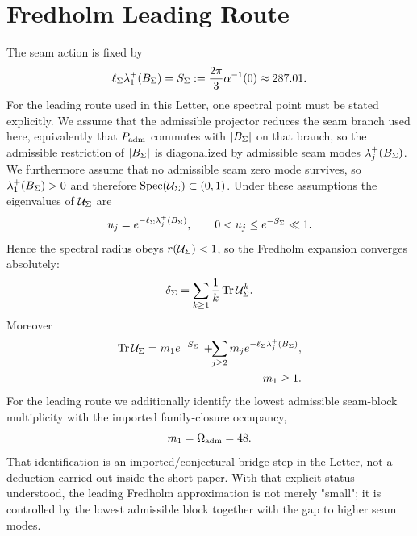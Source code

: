 \section{Fredholm Leading Route}

The seam action is fixed by
\begin{equation}
\ell_{\Sigma}\lambda_1^+(B_{\Sigma})
=
S_{\Sigma}
:=
\frac{2\pi}{3}\alpha^{-1}(0)
\approx
287.01.
\label{eq:seam-action}
\end{equation}
For the leading route used in this Letter, one spectral point must be stated explicitly. We assume that the admissible projector reduces the seam branch used here, equivalently that $P_{\mathrm{adm}}$ commutes with $|B_{\Sigma}|$ on that branch, so the admissible restriction of $|B_{\Sigma}|$ is diagonalized by admissible seam modes $\lambda_j^+(B_{\Sigma})$. We furthermore assume that no admissible seam zero mode survives, so $\lambda_1^+(B_{\Sigma})>0$ and therefore $\operatorname{Spec}(\mathcal U_{\Sigma})\subset(0,1)$. Under these assumptions the eigenvalues of $\mathcal U_{\Sigma}$ are
\[
u_j=e^{-\ell_{\Sigma}\lambda_j^+(B_{\Sigma})},
\qquad
0<u_j\le e^{-S_{\Sigma}}\ll1.
\]
Hence the spectral radius obeys $r(\mathcal U_{\Sigma})<1$, so the Fredholm expansion converges absolutely:
\begin{equation}
\delta_{\Sigma}
=
\sum_{k\ge1}\frac{1}{k}\,\mathrm{Tr}\,\mathcal U_{\Sigma}^k.
\label{eq:fredholm-expansion}
\end{equation}
Moreover
\begin{equation}
\begin{aligned}
\mathrm{Tr}\,\mathcal U_{\Sigma}
=
m_1e^{-S_{\Sigma}}
\,+\!\!\sum_{j\ge2}m_j e^{-\ell_{\Sigma}\lambda_j^+(B_{\Sigma})},\\
m_1\ge1.
\end{aligned}
\label{eq:trace-split}
\end{equation}
For the leading route we additionally identify the lowest admissible seam-block multiplicity with the imported family-closure occupancy,
\[
m_1=\Omega_{\mathrm{adm}}=48.
\]
That identification is an imported/conjectural bridge step in the Letter, not a deduction carried out inside the short paper. With that explicit status understood, the leading Fredholm approximation is not merely "small"; it is controlled by the lowest admissible block together with the gap to higher seam modes.

